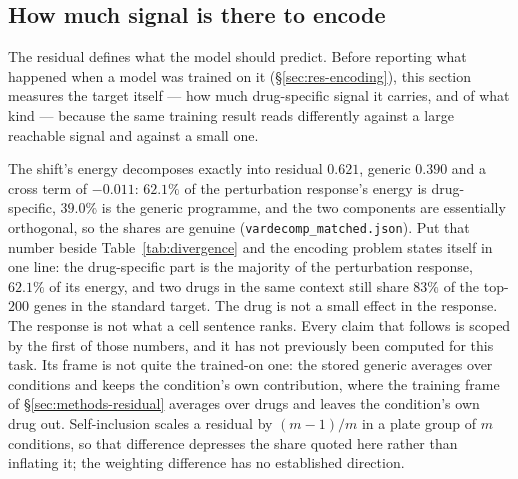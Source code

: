 \subsection{How much signal is there to encode}
\label{sec:methods-vardecomp}
\label{sec:res-transfer}

The residual defines what the model should predict. Before reporting what happened when a model was
trained on it (\S\ref{sec:res-encoding}), this section measures the target itself --- how much
drug-specific signal it carries, and of what kind --- because the same training result reads
differently against a large reachable signal and against a small one.

The shift's energy decomposes exactly into residual $0.621$, generic $0.390$ and a cross term of
$-0.011$: $62.1\%$ of the perturbation response's energy is drug-specific, $39.0\%$ is the generic
programme, and the two components are essentially orthogonal, so the shares are genuine
(\texttt{vardecomp\_matched.json}). Put that number beside Table~\ref{tab:divergence} and the
encoding problem states itself in one line: the drug-specific part is the majority of the
perturbation response, $62.1\%$ of its energy, and two drugs in the same context still share $83\%$
of the top-$200$ genes in the standard target. The drug is not a small effect in the response. The
response is not what a cell sentence ranks. Every claim that follows is scoped by the first of those
numbers, and it has not previously been computed for this task. Its frame is not quite the
trained-on one: the stored generic averages over conditions and keeps the condition's own
contribution, where the training frame of \S\ref{sec:methods-residual} averages over drugs and
leaves the condition's own drug out. Self-inclusion scales a residual by $(m-1)/m$ in a plate group
of $m$ conditions, so that difference depresses the share quoted here rather than inflating it; the
weighting difference has no established direction.

